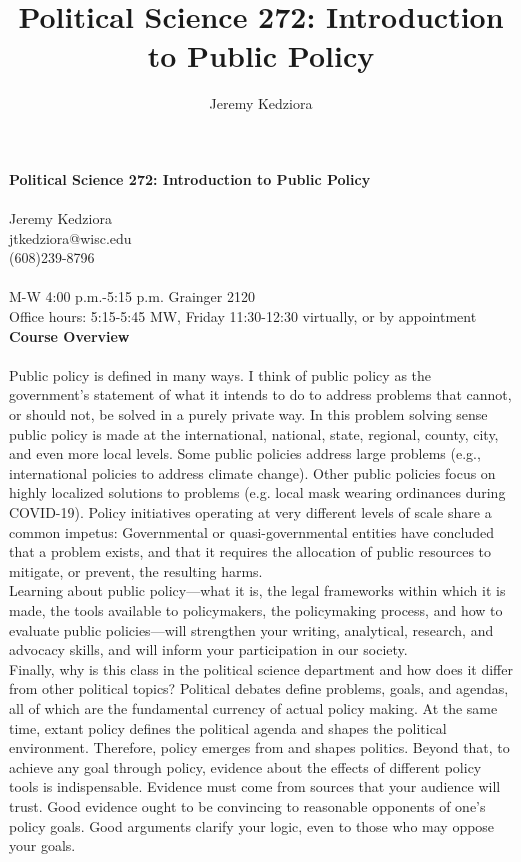 \documentclass[12pt]{article}
\title{Political Science 272: Introduction to Public Policy}
\author{Jeremy Kedziora}
\begin{document}
\noindent\Large \textbf{Political Science 272: Introduction to Public Policy}\\
\\
\normalsize Jeremy Kedziora\\
jtkedziora@wisc.edu\\
(608)239-8796\\
\\
M-W 4:00 p.m.-5:15 p.m. Grainger 2120\\
Office hours: 5:15-5:45 MW, Friday 11:30-12:30 virtually, or by appointment\\

\noindent \Large \textbf{Course Overview}\normalsize\\
\\
Public policy is defined in many ways. I think of public policy as the government’s statement of what it intends to do to address problems that cannot, or should not, be solved in a purely private way.  In this problem solving sense public policy is made at the international, national, state, regional, county, city, and even more local levels.  Some public policies address large problems (e.g., international policies to address climate change).  Other public policies focus on highly localized solutions to problems (e.g. local mask wearing ordinances during COVID-19).  Policy initiatives operating at very different levels of scale share a common impetus: Governmental or quasi-governmental entities have concluded that a problem exists, and that it requires the allocation of public resources to mitigate, or prevent, the resulting harms.\\

\noindent Learning about public policy—what it is, the legal frameworks within which it is made, the tools available to policymakers, the policymaking process, and how to evaluate public policies—will strengthen your writing, analytical, research, and advocacy skills, and will inform your participation in our society.\\

\noindent Finally, why is this class in the political science department and how does it differ from other political topics?  Political debates define problems, goals, and agendas, all of which are the fundamental currency of actual policy making.  At the same time, extant policy defines the political agenda and shapes the political environment.  Therefore, policy emerges from and shapes politics.  Beyond that, to achieve any goal through policy, evidence about the effects of different policy tools is indispensable. Evidence must come from sources that your audience will trust. Good evidence ought to be convincing to reasonable opponents of one’s policy goals. Good arguments clarify your logic, even to those who may oppose your goals.\\
\end{document}
